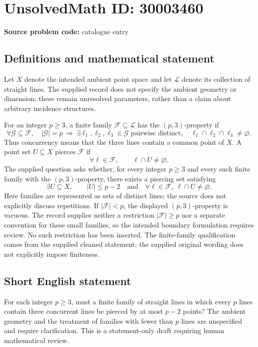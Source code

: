\documentclass[11pt]{article}
\begin{document}
\section*{UnsolvedMath ID: 30003460}
\textbf{Source problem code:} catalogue entry
\subsection{Definitions and mathematical statement}
Let \(X\) denote the intended ambient point space and let \(\mathcal L\) denote its collection of straight lines. The supplied record does not specify the ambient geometry or dimension; these remain unresolved parameters, rather than a claim about arbitrary incidence structures.

For an integer \(p\geq 3\), a finite family \(\mathcal F\subseteq\mathcal L\) has the \((p,3)\)-property if
\[
\forall\mathcal G\subseteq\mathcal F,\quad
|\mathcal G|=p\ \Longrightarrow\
\exists\ell_1,\ell_2,\ell_3\in\mathcal G\text{ pairwise distinct},\quad
\ell_1\cap\ell_2\cap\ell_3\ne\varnothing.
\]
Thus concurrency means that the three lines contain a common point of \(X\). A point set \(U\subseteq X\) pierces \(\mathcal F\) if
\[
\forall\ell\in\mathcal F,\qquad \ell\cap U\ne\varnothing.
\]
The supplied question asks whether, for every integer \(p\geq3\) and every such finite family with the \((p,3)\)-property, there exists a piercing set satisfying
\[
\exists U\subseteq X,\qquad |U|\leq p-2
\quad\text{and}\quad
\forall\ell\in\mathcal F,\ \ell\cap U\ne\varnothing.
\]
Here families are represented as sets of distinct lines; the source does not explicitly discuss repetitions. If \(|\mathcal F|<p\), the displayed \((p,3)\)-property is vacuous. The record supplies neither a restriction \(|\mathcal F|\geq p\) nor a separate convention for these small families, so the intended boundary formulation requires review. No such restriction has been inserted. The finite-family qualification comes from the supplied cleaned statement; the supplied original wording does not explicitly impose finiteness.
\subsection{Short English statement}
For each integer \(p\geq3\), must a finite family of straight lines in which every \(p\) lines contain three concurrent lines be pierced by at most \(p-2\) points? The ambient geometry and the treatment of families with fewer than \(p\) lines are unspecified and require clarification. This is a statement-only draft requiring human mathematical review.
\end{document}
